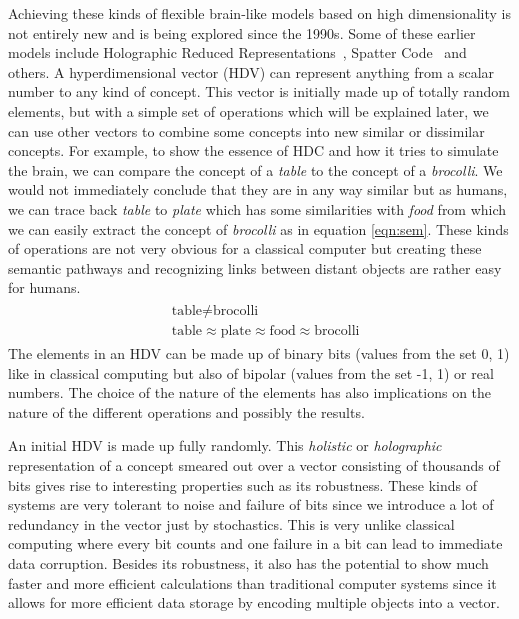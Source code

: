 Achieving these kinds of flexible brain-like models based on high dimensionality is not entirely new and is being explored since the 1990s. Some of these earlier models include Holographic Reduced Representations~\cite{HRR}, Spatter Code~\cite{spatter} and others. A hyperdimensional vector (HDV) can represent anything from a scalar number to any kind of concept. This vector is initially made up of totally random elements, but with a simple set of operations which will be explained later, we can use other vectors to combine some concepts into new similar or dissimilar concepts. For example, to show the essence of HDC and how it tries to simulate the brain, we can compare the concept of a \textit{table} to the concept of a \textit{brocolli}. We would not immediately conclude that they are in any way similar but as humans, we can trace back \textit{table} to \textit{plate} which has some similarities with \textit{food} from which we can easily extract the concept of \textit{brocolli} as in equation \ref{eqn:sem}. These kinds of operations are not very obvious for a classical computer but creating these semantic pathways and recognizing links between distant objects are rather easy for humans.
\begin{align}\label{eqn:sem}
    \begin{split}
    &\textrm{table} \neq \textrm{brocolli} \\        
    &\textrm{table} \approx \textrm{plate} \approx \textrm{food} \approx \textrm{brocolli}
    \end{split}
\end{align}
The elements in an HDV can be made up of binary bits (values from the set {0, 1}) like in classical computing but also of bipolar (values from the set {-1, 1}) or real numbers. The choice of the nature of the elements has also implications on the nature of the different operations and possibly the results.

An initial HDV is made up fully randomly. This \textit{holistic} or \textit{holographic} representation of a concept smeared out over a vector consisting of thousands of bits gives rise to interesting properties such as its robustness. These kinds of systems are very tolerant to noise and failure of bits since we introduce a lot of redundancy in the vector just by stochastics. This is very unlike classical computing where every bit counts and one failure in a bit can lead to immediate data corruption. Besides its robustness, it also has the potential to show much faster and more efficient calculations than traditional computer systems since it allows for more efficient data storage by encoding multiple objects into a vector.
